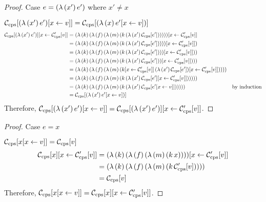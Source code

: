 \begin{proof}{Case $e=\abs{x'}{e'}$ where $x'\ne x$}

$\Ccps{\abs{x'}{e'}[x\leftarrow v]}=\Ccps{\abs{x}{e'[x\leftarrow v]}}$
\begin{align*}
\Ccps{\abs{x'}{e'}}[x\leftarrow \Cpcps{v}] &=\abs{k}{\abs{f}{\abs{m}{\app{k}{\abs{x'}{\Ccps{e'}}}}}}[x\leftarrow \Cpcps{v}]\\
                                           &=\abs{k}{\abs{f}{\abs{m}{\app{k}{\abs{x'}{\Ccps{e'}}}}}[x\leftarrow \Cpcps{v}]}\\
                                           &=\abs{k}{\abs{f}{\abs{m}{\app{k}{\abs{x'}{\Ccps{e'}}}}[x\leftarrow \Cpcps{v}]}}\\
                                           &=\abs{k}{\abs{f}{\abs{m}{\app{k}{\abs{x'}{\Ccps{e'}}}[x\leftarrow \Cpcps{v}]}}}\\
                                           &=\abs{k}{\abs{f}{\abs{m}{\app{k[x\leftarrow \Cpcps{v}]}{\abs{x'}{\Ccps{e'}}[x\leftarrow \Cpcps{v}]}}}}\\
                                           &=\abs{k}{\abs{f}{\abs{m}{\app{k}{\abs{x'}{\Ccps{e'}[x\leftarrow \Cpcps{v}]}}}}}\\
                                           &=\abs{k}{\abs{f}{\abs{m}{\app{k}{\abs{x'}{\Ccps{e'[x\leftarrow v]}}}}}} &\text{by induction}\\
                                           &=\Ccps{\abs{x'}{e'[x\leftarrow v]}}
\end{align*}
Therefore, $\Ccps{\abs{x'}{e'}[x\leftarrow v]}=\Ccps{\abs{x'}{e'}}[x\leftarrow \Cpcps{v}]$.
\end{proof}

\begin{proof}{Case $e=x$}

$\Ccps{x[x\leftarrow v]}=\Ccps{v}$
\begin{align*}
\Ccps{x}[x\leftarrow \Cpcps{v}] &=\abs{k}{\abs{f}{\abs{m}{\app{k}{x}}}}[x\leftarrow \Cpcps{v}]\\
                                &=\abs{k}{\abs{f}{\abs{m}{\app{k}{\Cpcps{v}}}}}\\
                                &=\Ccps{v}
\end{align*}
Therefore, $\Ccps{x[x\leftarrow v]}=\Ccps{x}[x\leftarrow \Cpcps{v}]$.
\end{proof}

